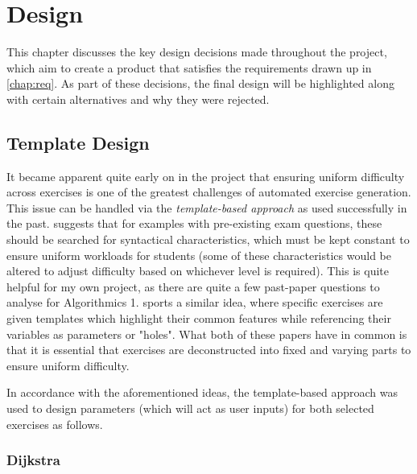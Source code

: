 \documentclass{l4proj}
\begin{document}
\chapter{Design}
\label{chap:des}

This chapter discusses the key design decisions made throughout the project, which aim to create a product that satisfies the requirements drawn up in \autoref{chap:req}. As part of these decisions, the final design will be highlighted along with certain alternatives and why they were rejected.

\section{Template Design}
\label{sec:td}

It became apparent quite early on in the project that ensuring uniform difficulty across exercises is one of the greatest challenges of automated exercise generation. This issue can be handled via the \emph{template-based approach} as used successfully in the past. \citet{Hoz21} suggests that for examples with pre-existing exam questions, these should be searched for syntactical characteristics, which must be kept constant to ensure uniform workloads for students (some of these characteristics would be altered to adjust difficulty based on whichever level is required). This is quite helpful for my own project, as there are quite a few past-paper questions to analyse for Algorithmics 1. \citet{Sad12} sports a similar idea, where specific exercises are given templates which highlight their common features while referencing their variables as parameters or "holes". What both of these papers have in common is that it is essential that exercises are deconstructed into fixed and varying parts to ensure uniform difficulty.

In accordance with the aforementioned ideas, the template-based approach was used to design parameters (which will act as user inputs) for both selected exercises as follows.

\subsection{Dijkstra}
\label{sec:tdd}
\end{document}
